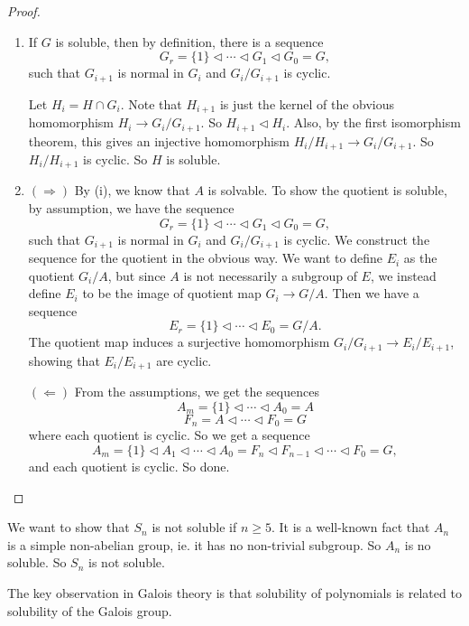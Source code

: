 \documentclass[a4paper]{article}
\begin{document}
\begin{proof}\leavevmode
  \begin{enumerate}
    \item If $G$ is soluble, then by definition, there is a sequence
      \[
        G_r = \{1\} \lhd \cdots \lhd G_1 \lhd G_0 = G,
      \]
      such that $G_{i + 1}$ is normal in $G_i$ and $G_i/G_{i + 1}$ is cyclic.

      Let $H_i = H \cap G_i$. Note that $H_{i + 1}$ is just the kernel of the obvious homomorphism $H_i \to G_i/G_{i + 1}$. So $H_{i + 1} \lhd H_i$. Also, by the first isomorphism theorem, this gives an injective homomorphism $H_i/H_{i + 1} \to G_i/G_{i + 1}$. So $H_i/H_{i + 1}$ is cyclic. So $H$ is soluble.

    \item $(\Rightarrow)$ By (i), we know that $A$ is solvable. To show the quotient is soluble, by assumption, we have the sequence
      \[
        G_r = \{1\} \lhd \cdots \lhd G_1 \lhd G_0 = G,
      \]
      such that $G_{i + 1}$ is normal in $G_i$ and $G_i/G_{i + 1}$ is cyclic. We construct the sequence for the quotient in the obvious way. We want to define $E_i$ as the quotient $G_i/A$, but since $A$ is not necessarily a subgroup of $E$, we instead define $E_i$ to be the image of quotient map $G_i \to G/A$. Then we have a sequence
      \[
        E_r = \{1\} \lhd \cdots \lhd E_0 = G/A.
      \]
      The quotient map induces a surjective homomorphism $G_i/G_{i + 1} \to E_i/E_{i + 1}$, showing that $E_i/E_{i + 1}$ are cyclic.

      $(\Leftarrow)$ From the assumptions, we get the sequences
      \[
        A_m = \{1\} \lhd \cdots \lhd A_0 = A
      \]
      \[
        F_n = A \lhd \cdots \lhd F_0 = G
      \]
      where each quotient is cyclic. So we get a sequence
      \[
        A_m = \{1\} \lhd A_1 \lhd \cdots \lhd A_0 = F_n \lhd F_{n - 1} \lhd \cdots \lhd F_0 = G,
      \]
      and each quotient is cyclic. So done.
  \end{enumerate}
\end{proof}

\begin{eg}
  We want to show that $S_n$ is not soluble if $n \geq 5$. It is a well-known fact that $A_n$ is a simple non-abelian group, ie. it has no non-trivial subgroup. So $A_n$ is no soluble. So $S_n$ is not soluble.
\end{eg}

The key observation in Galois theory is that solubility of polynomials is related to solubility of the Galois group.
\end{document}
